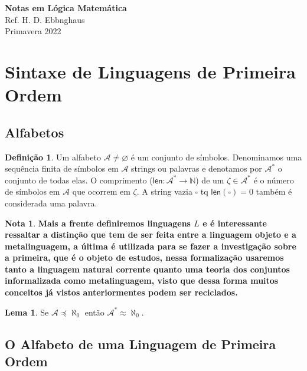 \documentclass[11pt]{article}
\theoremstyle{definition}
\newtheorem{defn}{Definição}
\newtheorem{note}{Nota}
\newtheorem{lemma}{Lema}
\newcommand{\mc}[1]{\mathcal{#1}}
\newcommand{\msf}[1]{\mathsf{#1}}
\newcommand{\mbb}[1]{\mathbb{#1}}
\begin{document}
\setcounter{section}{0}
\thispagestyle{empty}

\begin{center}
{\LARGE \bf Notas em Lógica Matemática}\\
{\large Ref. H. D. Ebbnghaus}\\
Primavera 2022
\end{center}

\tableofcontents

\section{Sintaxe de Linguagens de Primeira Ordem}

\subsection{Alfabetos}

\begin{shaded}
\begin{defn}
Um alfabeto $\mc{A}\ne\varnothing$ é um conjunto de símbolos. Denominamos uma sequência finita de símbolos em $\mc{A}$ strings ou palavras e denotamos por $\mc{A}^*$ o conjunto de todas elas. O comprimento ($\msf{len}:\mc{A}^*\to\mbb{N}$) de um $\zeta\in \mc{A}^*$ é o número de símbolos em $\mc{A}$ que ocorrem em $\zeta$. A string vazia $\square$ tq $\msf{len}(\square)=0$ também é considerada uma palavra.
\end{defn}
\end{shaded}

\begin{note}
\textbf{Mais a frente definiremos linguagens $L$ e é interessante ressaltar a distinção que tem de ser feita entre a linguagem objeto e a metalinguagem, a última é utilizada para se fazer a investigação sobre a primeira, que é o objeto de estudos, nessa formalização usaremos tanto a linguagem natural corrente quanto uma teoria dos conjuntos informalizada como metalinguagem, visto que dessa forma muitos conceitos já vistos anteriormentes podem ser reciclados.}
\end{note}

\begin{lemma}
Se $\mc{A}\preceq\aleph_0$ então $\mc{A}^*\approx\aleph_0$.
\end{lemma}

\subsection{O Alfabeto de uma Linguagem de Primeira Ordem}
\end{document}
